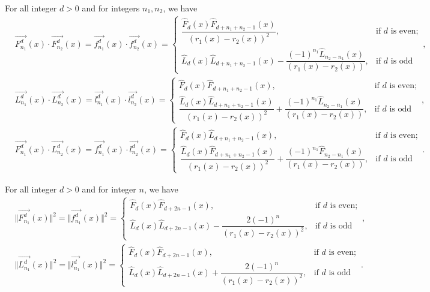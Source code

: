 \begin{theorem}
For all integer $d > 0$ and for integers $n_1, n_2$, we have
\begin{align*}
&\stackrel{\rightarrow}{F_{n_1}^d}(x)\cdot  \stackrel{\rightarrow}{F_{n_2}^d}(x) = \stackrel{\rightarrow}{f_{n_1}^d}(x)\cdot  \stackrel{\rightarrow}{f_{n_2}^d}(x) =
 \begin{cases}
 \dfrac{\widehat{F}_{d}(x)\widehat{F}_{d+n_1+n_2-1}(x)}{(r_1(x) - r_2(x))^2}, & \text {if $d$ is even};\\
 \widehat{L}_{d}(x)\widehat{L}_{d+n_1+n_2-1}(x)-\dfrac{(-1)^{n_1}\widehat{L}_{n_2-n_1}(x)}{(r_1(x) - r_2(x))}, & \text{if $d$ is odd}
 \end{cases},\\
&\stackrel{\rightarrow}{L_{n_1}^d}(x)\cdot  \stackrel{\rightarrow}{L_{n_2}^d}(x) = \stackrel{\rightarrow}{l_{n_1}^d}(x)\cdot  \stackrel{\rightarrow}{l_{n_2}^d}(x) =
 \begin{cases}
 \widehat{F}_{d}(x)\widehat{F}_{d+n_1+n_2-1}(x), & \text {if $d$ is even};\\
 \dfrac{\widehat{L}_{d}(x)\widehat{L}_{d+n_1+n_2-1}(x)}{(r_1(x) - r_2(x))^2}+\dfrac{(-1)^{n_1}\widehat{L}_{n_2-n_1}(x)}{(r_1(x) - r_2(x))}, & \text{if $d$ is odd}
 \end{cases},\\
&\stackrel{\rightarrow}{F_{n_1}^d}(x)\cdot  \stackrel{\rightarrow}{L_{n_2}^d}(x) = \stackrel{\rightarrow}{f_{n_1}^d}(x)\cdot  \stackrel{\rightarrow}{l_{n_2}^d}(x) =
 \begin{cases}
  \widehat{F}_{d}(x)\widehat{L}_{d+n_1+n_2-1}(x), & \text {if $d$ is even};\\
  \dfrac{\widehat{L}_{d}(x)\widehat{F}_{d+n_1+n_2-1}(x)}{(r_1(x) - r_2(x))^2}+\dfrac{(-1)^{n_1}\widehat{F}_{n_2-n_1}(x)}{(r_1(x) - r_2(x))}, & \text{if $d$ is odd}
 \end{cases}.
 \end{align*}
\end{theorem}
\begin{theorem} For all integer $d > 0$ and for integer $n$, we have
\begin{align*}
&\Vert \stackrel{\rightarrow}{F_{n_1}^d}(x)\Vert^2 = \Vert \stackrel{\rightarrow}{f_{n_1}^d}(x)\Vert^2 =
 \begin{cases}
  \widehat{F}_{d}(x)\widehat{F}_{d+2n-1}(x), & \text {if $d$ is even};\\
\widehat{L}_{d}(x)\widehat{L}_{d+2n-1}(x)-\dfrac{2(-1)^{n}}{(r_1(x) - r_2(x))^2}, & \text{if $d$ is odd}
 \end{cases},\\ 
&\Vert\stackrel{\rightarrow}{L_{n_1}^d}(x)\Vert^2 = \Vert\stackrel{\rightarrow}{l_{n_1}^d}(x)\Vert^2=
 \begin{cases}
 \widehat{F}_{d}(x)\widehat{F}_{d+2n-1}(x), & \text {if $d$ is even};\\
\widehat{L}_{d}(x)\widehat{L}_{d+2n-1}(x)+\dfrac{2(-1)^{n}}{(r_1(x) - r_2(x))^2}, & \text{if $d$ is odd}
 \end{cases}.
 \end{align*}
\end{theorem}

